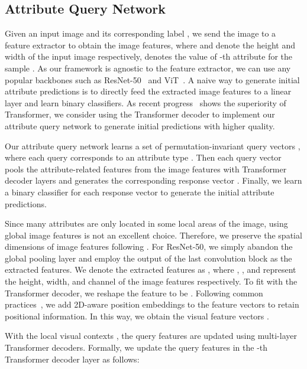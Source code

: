 \documentclass[runningheads]{llncs}
\begin{document}
\subsection{Attribute Query Network}

Given an input image  and its corresponding label , we send the image to a feature extractor to obtain the image features, where  and  denote the height and width of the input image respectively,  denotes the value of -th attribute  for the sample . As our framework is agnostic to the feature extractor, we can use any popular backbones such as  ResNet-50~\cite{he2016deep} and ViT~\cite{dosovitskiy2020image}.  A naive way to generate initial attribute predictions is to directly feed the extracted image features to a linear layer and learn  binary classifiers. As recent progress~\cite{zhang2021temporal,doersch2020crosstransformers,lanchantin2021general,liu2021query2label} shows the superiority of Transformer, we consider using the Transformer decoder to implement our attribute query network to generate initial predictions with higher quality.

Our attribute query network learns a set of permutation-invariant  query vectors , where each query  corresponds to an attribute type . Then each query vector  pools the attribute-related features from the image features with Transformer decoder layers and generates the corresponding response vector . Finally, we learn a binary classifier for each response vector to generate the initial attribute predictions.


Since many attributes are only located in some local areas of the image, using global image features is not an excellent choice. Therefore, we preserve the spatial dimensions of image features following \cite{liu2021query2label}. For ResNet-50, we simply abandon the global pooling layer and employ the output of the last convolution block as the extracted features. We denote the extracted features as , where , , and  represent the height, width, and channel of the image features respectively. To fit with the Transformer decoder, we reshape the feature to be . Following common practices~\cite{carion2020end,dosovitskiy2020image}, we add 2D-aware position embeddings  to the feature vectors  to retain positional information. In this way, we obtain the visual feature vectors .



With the local visual contexts , the query features  are updated using multi-layer Transformer decoders. Formally, we update the query features  in the -th Transformer decoder layer as follows:
\end{document}
